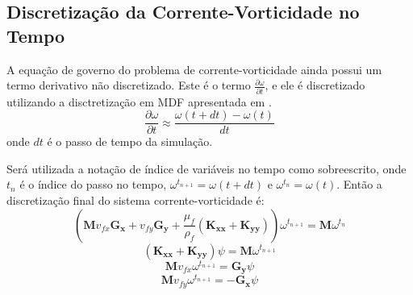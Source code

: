 \subsection{\textbf{Discretização da Corrente-Vorticidade no Tempo}}
A equação de governo  do problema de corrente-vorticidade ainda possui um termo derivativo não discretizado.
Este é o termo $\tfrac{\partial \omega}{\partial t}$, e ele é discretizado utilizando a disctretização em MDF apresentada em .
 \begin{equation}
    \dfrac{\partial \omega}{\partial t} \approx
    \frac{
        \omega(t + dt) -
        \omega(t)
    }{dt}
\end{equation}
onde $dt$ é o passo de tempo da simulação.

Será utilizada a notação de índice de variáveis no tempo como sobreescrito, onde $t_n$ é o índice do passo no tempo, $\omega^{t_{n+1}} = \omega(t + dt)$ e $\omega^{t_{n}} = \omega(t)$.
Então a discretização final do sistema corrente-vorticidade é:
\begin{equation}
    \left(
        \mathbf{M}
        v_{fx}
        \mathbf{G_x}+
        v_{fy}
        \mathbf{G_y} +
        \dfrac{\mu_f}{\rho_f}
        \left(
        \mathbf{K_{xx}} +
        \mathbf{K_{yy}}
        \right)
    \right)
    \omega^{t_{n+1}} = 
    \mathbf{M}
    \omega^{t_{n}}
    \label{last_w}
\end{equation}
\begin{equation}
    \left(
    \mathbf{K_{xx}} +
    \mathbf{K_{yy}}
    \right)
    \psi =
    \mathbf{M}
    \omega^{t_{n+1}}
    \label{last_psi}
\end{equation}
\begin{equation}
    \mathbf{M}
    v_{fx}
    \omega^{t_{n+1}} =
    \mathbf{G_y}
    \psi
    \label{last_vx}
\end{equation}
\begin{equation}
    \mathbf{M}
    v_{fy}
    \omega^{t_{n+1}} = -
    \mathbf{G_x}
    \psi
    \label{last_vy}
\end{equation}



